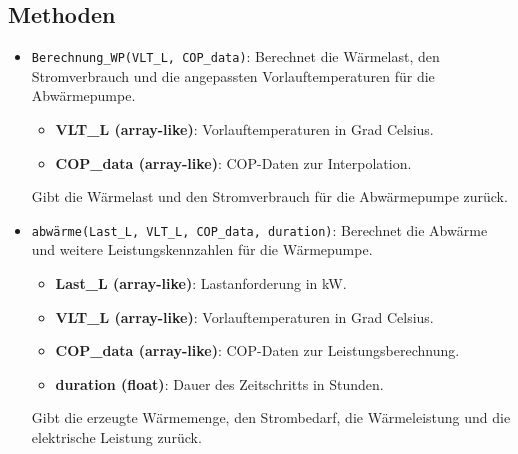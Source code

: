 \subsection{Methoden}
\begin{itemize}
    \item \texttt{Berechnung\_WP(VLT\_L, COP\_data)}: Berechnet die Wärmelast, den Stromverbrauch und die angepassten Vorlauftemperaturen für die Abwärmepumpe.
    \begin{itemize}
        \item \textbf{VLT\_L (array-like)}: Vorlauftemperaturen in Grad Celsius.
        \item \textbf{COP\_data (array-like)}: COP-Daten zur Interpolation.
    \end{itemize}
    Gibt die Wärmelast und den Stromverbrauch für die Abwärmepumpe zurück.

    \item \texttt{abwärme(Last\_L, VLT\_L, COP\_data, duration)}: Berechnet die Abwärme und weitere Leistungskennzahlen für die Wärmepumpe.
    \begin{itemize}
        \item \textbf{Last\_L (array-like)}: Lastanforderung in kW.
        \item \textbf{VLT\_L (array-like)}: Vorlauftemperaturen in Grad Celsius.
        \item \textbf{COP\_data (array-like)}: COP-Daten zur Leistungsberechnung.
        \item \textbf{duration (float)}: Dauer des Zeitschritts in Stunden.
    \end{itemize}
    Gibt die erzeugte Wärmemenge, den Strombedarf, die Wärmeleistung und die elektrische Leistung zurück.


\end{itemize}
